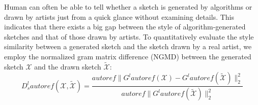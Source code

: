 \documentclass[10pt,twocolumn,letterpaper]{article}
\begin{document}
Human can often be able to tell whether a sketch is generated by algorithms or drawn by artists just from a quick glance without examining details. This indicates that there exists a big gap between the style of algorithm-generated sketches and that of those drawn by artists. To quantitatively evaluate the style similarity between a generated sketch and the sketch drawn by a real artist, we employ the normalized gram matrix difference (NGMD) between the generated sketch $\mathcal{X}$ and the drawn sketch ${\tilde {\mathcal{X}}}$:
\begin{equation}
{D^l_s}autoref( {\mathcal{X},\tilde {\mathcal{X}}} ) = \frac{{autoref\| {{G^l}autoref( \mathcal{X} ) - {G^l}autoref( {\tilde {\mathcal{X}}} )} \|_2^2}}{{autoref\| {{G^l}autoref( {\tilde {\mathcal{X}}} )} \|_2^2}}
\label{eq:style_exp}
\end{equation}
\end{document}
